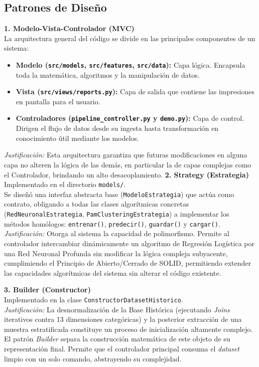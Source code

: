\subsection{Patrones de Diseño}

\textbf{1. Modelo-Vista-Controlador (MVC)} \\
La arquitectura general del código se divide en las principales componentes de un sistema:
\begin{itemize}
	\item \textbf{Modelo (\texttt{src/models}, \texttt{src/features}, \texttt{src/data}):} Capa lógica. Encapsula toda la matemática, algoritmos y la manipulación de datos.
	\item \textbf{Vista (\texttt{src/views/reports.py}):} Capa de salida que contiene las impresiones en pantalla para el usuario.
	\item \textbf{Controladores (\texttt{pipeline\_controller.py} y \texttt{demo.py}):} Capa de control. Dirigen el flujo de datos desde su ingesta hasta transformación en conocimiento útil mediante los modelos.
\end{itemize}
\textit{Justificación:} Esta arquitectura garantiza que futuras modificaciones en alguna capa no alteren la lógica de las demás, en particular la de capas complejas como el Controlador, brindando un alto desacoplamiento.
\newpage
\textbf{2. Strategy (Estrategia)} \\
Implementado en el directorio \texttt{models/}. \\
Se diseñó una interfaz abstracta base (\texttt{ModeloEstrategia}) que actúa como contrato, obligando a todas las clases algorítmicas concretas (\texttt{RedNeuronalEstrategia}, \texttt{PamClusteringEstrategia}) a implementar los métodos homólogos: \texttt{entrenar()}, \texttt{predecir()}, \texttt{guardar()} y \texttt{cargar()}. \\
\textit{Justificación:} Otorga al sistema la capacidad de polimorfismo. Permite al controlador intercambiar dinámicamente un algoritmo de Regresión Logística por una Red Neuronal Profunda sin modificar la lógica compleja subyacente, cumplimiendo el Principio de Abierto/Cerrado de SOLID, permitiendo extender las capacidades algorítmicas del sistema sin alterar el código existente.

\textbf{3. Builder (Constructor)} \\
Implementado en la clase \texttt{ConstructorDatasetHistorico}. \\
\textit{Justificación:} La desnormalización de la Base Histórica (ejecutando \textit{Joins} iterativos contra 13 dimensiones categóricas) y la posterior extracción de una muestra estratificada constituye un proceso de inicialización altamente complejo. El patrón \textit{Builder} separa la construcción matemática de este objeto de su representación final. Permite que el controlador principal consuma el \textit{dataset} limpio con un solo comando, abstrayendo su complejidad.


